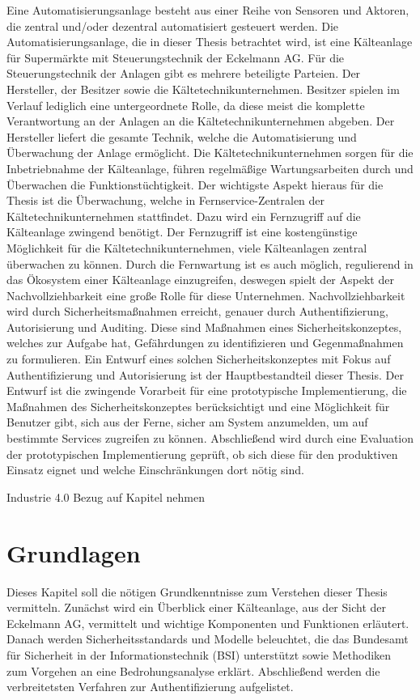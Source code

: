 \documentclass[11pt,a4paper]{report}
\begin{document}
Eine Automatisierungsanlage besteht aus einer Reihe von Sensoren und Aktoren, die zentral und/oder dezentral automatisiert gesteuert werden. Die Automatisierungsanlage, die in dieser Thesis betrachtet wird, ist eine Kälteanlage für Supermärkte mit Steuerungstechnik der Eckelmann AG. Für die Steuerungstechnik der Anlagen gibt es mehrere beteiligte Parteien. Der Hersteller, der Besitzer sowie die Kältetechnikunternehmen. Besitzer spielen im Verlauf lediglich eine untergeordnete Rolle, da diese meist die komplette Verantwortung an der Anlagen an die Kältetechnikunternehmen abgeben. Der Hersteller liefert die gesamte Technik, welche die Automatisierung und Überwachung der Anlage ermöglicht. Die Kältetechnikunternehmen sorgen für die Inbetriebnahme der Kälteanlage, führen regelmäßige Wartungsarbeiten durch und Überwachen die Funktionstüchtigkeit. Der wichtigste Aspekt hieraus für die Thesis ist die Überwachung, welche in Fernservice-Zentralen der Kältetechnikunternehmen stattfindet. Dazu wird ein Fernzugriff auf die Kälteanlage zwingend benötigt. Der Fernzugriff ist eine kostengünstige Möglichkeit für die Kältetechnikunternehmen, viele Kälteanlagen zentral überwachen zu können. Durch die Fernwartung ist es auch möglich, regulierend in das Ökosystem einer Kälteanlage einzugreifen, deswegen spielt der Aspekt der Nachvollziehbarkeit eine große Rolle für diese Unternehmen. Nachvollziehbarkeit wird durch Sicherheitsmaßnahmen erreicht, genauer durch Authentifizierung, Autorisierung und Auditing. Diese sind Maßnahmen eines Sicherheitskonzeptes, welches zur Aufgabe hat, Gefährdungen zu identifizieren und Gegenmaßnahmen zu formulieren. Ein Entwurf eines solchen Sicherheitskonzeptes mit Fokus auf Authentifizierung und Autorisierung ist der Hauptbestandteil dieser Thesis. Der Entwurf ist die zwingende Vorarbeit für eine prototypische Implementierung, die Maßnahmen des Sicherheitskonzeptes berücksichtigt und eine Möglichkeit für Benutzer gibt, sich aus der Ferne, sicher am System anzumelden, um auf bestimmte Services zugreifen zu können. Abschließend wird durch eine Evaluation der prototypischen Implementierung geprüft, ob sich diese für den produktiven Einsatz eignet und welche Einschränkungen dort nötig sind.

Industrie 4.0
Bezug auf Kapitel nehmen

\chapter{Grundlagen} \label{chap:basics}

Dieses Kapitel soll die nötigen Grundkenntnisse zum Verstehen dieser Thesis vermitteln. Zunächst wird ein Überblick einer Kälteanlage, aus der Sicht der Eckelmann AG, vermittelt und wichtige Komponenten und Funktionen erläutert. Danach werden Sicherheitsstandards und Modelle beleuchtet, die das Bundesamt für Sicherheit in der Informationstechnik (BSI) unterstützt sowie Methodiken zum Vorgehen an eine Bedrohungsanalyse erklärt. Abschließend werden die verbreitetsten Verfahren zur Authentifizierung aufgelistet.
\end{document}
